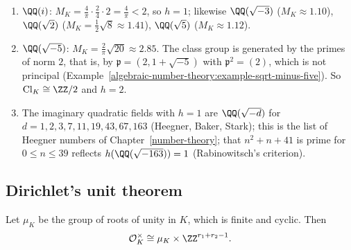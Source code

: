 \begin{example}\label{algebraic-number-theory:example-class-numbers}
\begin{enumerate}
\item $\QQ(i)$: $M_K = \frac4\pi \cdot \frac24 \cdot 2 = \frac4\pi < 2$, so $h = 1$; likewise $\QQ(\sqrt{-3})$ ($M_K \approx 1.10$), $\QQ(\sqrt 2)$ ($M_K = \frac12\sqrt8 \approx 1.41$), $\QQ(\sqrt 5)$ ($M_K \approx 1.12$).
\item $\QQ(\sqrt{-5})$: $M_K = \frac2\pi\sqrt{20} \approx 2.85$. The class group is generated by the primes of norm $2$, that is, by $\mathfrak{p} = (2, 1 + \sqrt{-5})$ with $\mathfrak{p}^2 = (2)$, which is not principal
(Example~\ref{algebraic-number-theory:example-sqrt-minus-five}). So $\mathrm{Cl}_K \cong \ZZ/2$ and $h = 2$.
\item The imaginary quadratic fields with $h = 1$ are $\QQ(\sqrt{-d})$ for $d = 1, 2, 3, 7, 11, 19, 43, 67, 163$ (Heegner, Baker, Stark); this is the list of Heegner numbers of
Chapter~\ref{number-theory}; that $n^2 + n + 41$ is prime for $0 \leq n \leq 39$ reflects $h(\QQ(\sqrt{-163})) = 1$ (Rabinowitsch's criterion).
\end{enumerate}
\end{example}

\subsection{Dirichlet's unit theorem}\label{algebraic-number-theory:subsection-units}

\begin{theorem}[Dirichlet]\label{algebraic-number-theory:theorem-units}
Let $\mu_K$ be the group of roots of unity in $K$, which is finite and cyclic. Then
\[
\mathcal{O}_K^\times \cong \mu_K \times \ZZ^{r_1 + r_2 - 1}.
\]
\end{theorem}

